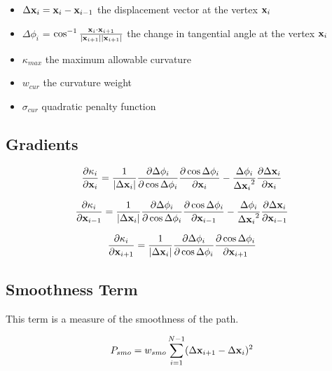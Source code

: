 \begin{itemize}
\item $\Delta\mathbf{x}_i = \mathbf{x}_i - \mathbf{x}_{i-1}$ the displacement vector at the vertex $\mathbf{x}_i$
\item $\Delta\phi_i$ = $\cos^{-1}\frac{\mathbf{x}_{i}\cdot\mathbf{x}_{i+1}}{|\mathbf{x}_{i+1}||\mathbf{x}_{i+1}| }$ the change in tangential angle at the vertex $\mathbf{x}_i$
\item $\kappa_{max}$ the maximum allowable curvature
\item $w_{cur}$ the curvature weight
\item $\sigma_{cur}$ quadratic penalty function
\end{itemize}

\subsection{Gradients}

\begin{equation}
\frac{\partial \kappa_i}{\partial \mathbf{x}_i} = \frac{1}{|\Delta\mathbf{x}_i|}\frac{\partial\Delta\phi_i}{\partial\cos\Delta\phi_i}\frac{\partial\cos\Delta\phi_i}{\partial\mathbf{x}_i}-\frac{\Delta\phi_i}{{\Delta\mathbf{x}_i}^2}\frac{\partial\Delta\mathbf{x}_i}{\partial\mathbf{x}_i}
\end{equation}

\begin{equation}
\frac{\partial \kappa_i}{\partial \mathbf{x}_{i-1}} = \frac{1}{|\Delta\mathbf{x}_i|}\frac{\partial\Delta\phi_i}{\partial\cos\Delta\phi_i}\frac{\partial\cos\Delta\phi_i}{\partial\mathbf{x}_{i-1}}-\frac{\Delta\phi_i}{{\Delta\mathbf{x}_i}^2}\frac{\partial\Delta\mathbf{x}_i}{\partial\mathbf{x}_{i-1}}
\end{equation}

\begin{equation}
\frac{\partial \kappa_i}{\partial \mathbf{x}_{i+1}} = \frac{1}{|\Delta\mathbf{x}_i|}\frac{\partial\Delta\phi_i}{\partial\cos\Delta\phi_i}\frac{\partial\cos\Delta\phi_i}{\partial\mathbf{x}_{i+1}}
\end{equation}

\subsection{Smoothness Term}
This term is a measure of the smoothness of the path.

\begin{equation}
P_{smo} = w_{smo} \displaystyle\sum_{i=1}^{N-1} (\Delta\mathbf{x}_{i+1} - \Delta\mathbf{x}_i)^2
\end{equation}

